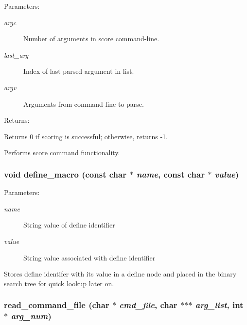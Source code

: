 \begin{Desc}
\item[Parameters: ]\par
\begin{description}
\item[{\em 
argc}]Number of arguments in score command-line. \item[{\em 
last\_\-arg}]Index of last parsed argument in list. \item[{\em 
argv}]Arguments from command-line to parse.\end{description}
\end{Desc}
\begin{Desc}
\item[Returns: ]\par
Returns 0 if scoring is successful; otherwise, returns -1.\end{Desc}
Performs score command functionality. 
\subsubsection{\setlength{\rightskip}{0pt plus 5cm}void define\_\-macro (const char $\ast$ {\em name}, const char $\ast$ {\em value})}\label{score_8c_a8}


\begin{Desc}
\item[Parameters: ]\par
\begin{description}
\item[{\em 
name}]String value of define identifier \item[{\em 
value}]String value associated with define identifier\end{description}
\end{Desc}
Stores define identifer with its value in a define node and placed in the binary search tree for quick lookup later on. 
\subsubsection{ read\_\-command\_\-file (char $\ast$ {\em cmd\_\-file}, char $\ast$$\ast$$\ast$ {\em arg\_\-list}, int $\ast$ {\em arg\_\-num})}\label{score_8c_a10}


